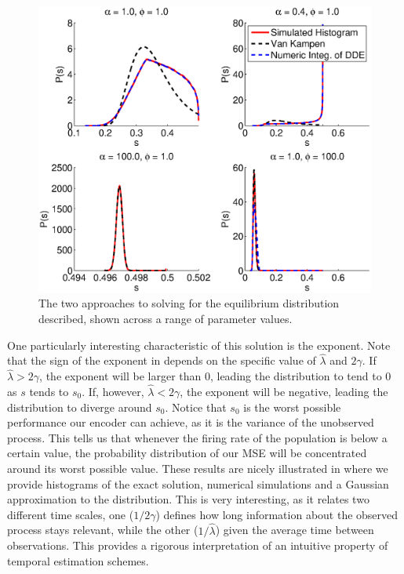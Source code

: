 \begin{figure}
\label{fig:comparison_histograms}
\includegraphics[width=\columnwidth]{figures/figure_3_1.eps}
\caption{The two approaches to solving for the equilibrium distribution described, shown across a range of parameter values.}
\end{figure}
One particularly interesting characteristic of this solution is the exponent. Note that the sign of the exponent in  depends on the specific value of $\hat{\lambda}$ and $2\gamma$. If $\hat{\lambda} > 2\gamma$, the exponent will be larger than 0, leading the distribution to tend to $0$ as $s$ tends to $s_0$. If, however, $\hat{\lambda} < 2\gamma$, the exponent will be negative, leading the distribution to diverge around $s_0$. Notice that $s_0$ is the worst possible performance our encoder can achieve, as it is the variance of the unobserved process. This tells us that whenever the firing rate of the population is below a certain value, the probability distribution of our MSE will be concentrated around its worst possible value. These results are nicely illustrated in  where we provide histograms of the exact solution, numerical simulations and a Gaussian approximation to the distribution. This is very interesting, as it relates two different time scales, one ($1/2\gamma$) defines how long information about the observed process stays relevant, while the other ($1/\hat{\lambda}$) given the average time between observations. This provides a rigorous interpretation of an intuitive property of temporal estimation schemes.
